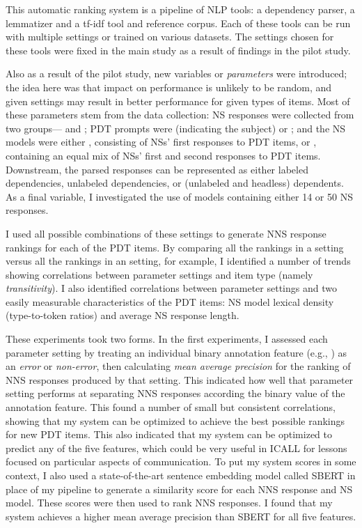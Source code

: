 This automatic ranking system is a pipeline of NLP tools: a dependency parser, a lemmatizer and a tf-idf tool and reference corpus. Each of these tools can be run with multiple settings or trained on various datasets.
The settings chosen for these tools were fixed in the main study as a result of findings in the pilot study.

Also as a result of the pilot study, new variables or \textit{parameters} were introduced; the idea here was that impact on performance is unlikely to be random, and given settings may result in better performance for given types of items. Most of these parameters stem from the data collection: NS responses were collected from two groups--- and ; PDT prompts were  (indicating the subject) or ; and the NS models were either , consisting of NSs' first responses to PDT items, or , containing an equal mix of NSs' first and second responses to PDT items. Downstream, the parsed responses can be represented as either labeled dependencies, unlabeled dependencies, or (unlabeled and headless) dependents. As a final variable, I investigated the use of models containing either 14 or 50 NS responses.

I used all possible combinations of these settings to generate NNS response rankings for each of the PDT items. By comparing all the rankings in a  setting versus all the rankings in an  setting, for example, I identified a number of trends showing correlations between parameter settings and item type (namely \textit{transitivity}). I also identified correlations between parameter settings and two easily measurable characteristics of the PDT items: NS model lexical density (type-to-token ratios) and average NS response length.

These experiments took two forms. In the first experiments, I assessed each parameter setting by treating an individual binary annotation feature (e.g., ) as an \textit{error} or \textit{non-error}, then calculating \textit{mean average precision} for the ranking of NNS responses produced by that setting. This indicated how well that parameter setting performs at separating NNS responses according the binary value of the annotation feature. This found a number of small but consistent correlations, showing that my system can be optimized to achieve the best possible rankings for new PDT items. This also indicated that my system can be optimized to predict any of the five features, which could be very useful in ICALL for lessons focused on particular aspects of communication. To put my system scores in some context, I also used a state-of-the-art sentence embedding model called SBERT in place of my pipeline to generate a similarity score for each NNS response and NS model. These scores were then used to rank NNS responses. I found that my system achieves a higher mean average precision than SBERT for all five features.

